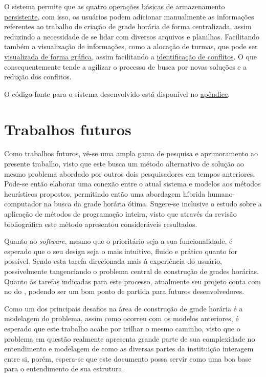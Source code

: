 O sistema permite que as \hyperref[sssec:Funcionalidades Iniciais]{quatro operações básicas de armazenamento persistente}, com isso, os usuários podem adicionar manualmente as informações referentes ao trabalho de criação de grade horária de forma centralizada, assim reduzindo a necessidade de se lidar com diversos arquivos e planilhas. Facilitando também a visualização de informações, como a alocação de turmas, que pode ser \hyperref[fig:multiFiltros]{visualizada de forma gráfica}, assim facilitando a \hyperref[sec:conflitos]{identificação de conflitos}. O que consequentemente tende a agilizar o processo de busca por novas soluções e a redução dos conflitos.

O código-fonte para o sistema desenvolvido está disponível no \hyperref[apendice:CodigoFonte]{apêndice}.

\section{Trabalhos futuros} %

Como trabalhos futuros, vê-se uma ampla gama de pesquisa e aprimoramento ao presente trabalho, visto que este busca um método alternativo de solução ao mesmo problema abordado por outros dois pesquisadores em tempos anteriores. Pode-se então elaborar uma conexão entre o atual sistema e modelos aos métodos heurísticos propostos, permitindo então uma abordagem híbrida humano-computador na busca da grade horária ótima. Sugere-se inclusive o estudo sobre a aplicação de métodos de programação inteira, visto que através da revisão bibliográfica este método apresentou consideráveis resultados.

Quanto ao \textit{software}, mesmo que o prioritário seja a sua funcionalidade, é esperado que o seu design seja o mais intuitivo, fluido e prático quanto for possível. Sendo esta tarefa direcionada mais à experiência do usuário, possivelmente tangenciando o problema central de construção de grades horárias. Quanto às tarefas indicadas para este processo, atualmente seu projeto conta com  no  do , podendo ser um bom ponto de partida para futuros desenvolvedores.

Como um dos principais desafios na área de construção de grade horária é a modelagem do problema, assim como ocorreu com os modelos anteriores, é esperado que este trabalho acabe por trilhar o mesmo caminho, visto que o problema em questão realmente apresenta grande parte de sua complexidade no entendimento e modelagem de como as diversas partes da instituição interagem entre si, porém, espera-se que este documento possa servir como uma boa base para o entendimento de sua estrutura.

